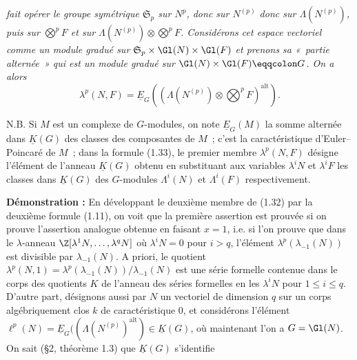 \emph{fait opérer le groupe symétrique $\mathfrak S_p$ sur $N^p$, donc sur $N^{(p)}$ donc sur $\Lambda(N^{(p)})$, puis sur $\bigotimes^p F$ et sur $\Lambda(N^{(p)})\otimes\bigotimes^p F$. Considérons cet espace vectoriel comme un module gradué sur $\mathfrak S_p\times\Gl(N)\times\Gl(F)$ et prenons sa «~partie alternée~» qui est un module gradué sur $\Gl(N)\times\Gl(F)\eqqcolon G$. On a alors}
\begin{equation}\tag{1.33}
\lambda^p(N,F)=\underline{E}_G\left(\left(\Lambda(N^{(p)})\otimes\bigotimes^p F\right)^{\mathrm{alt}}\right).
\end{equation}

N.B. Si $M$ est un complexe de $G$-modules, on note $\underline{E}_G(M)$ la somme alternée dans $\underline{K}(G)$ des classes des composantes de $M$~; c'est la caractéristique d'Euler--Poincaré de $M$~; dans la formule (1.33), le premier membre $\lambda^p(N,F)$ désigne l'élément de l'anneau $\underline{K}(G)$ obtenu en substituant aux variables $\lambda^iN$ et $\lambda^iF$ les classes dans $\underline{K}(G)$ des $G$-modules $\Lambda^i(N)$ et $\Lambda^i(F)$ respectivement.

\textbf{Démonstration :} En développant le deuxième membre de (1.32) par la deuxième formule (1.11), on voit que la première assertion est prouvée si on prouve l'assertion analogue obtenue en faisant $x=1$, i.e. si l'on prouve que dans le $\lambda$-anneau $\Z[\lambda^1N,\ldots,\lambda^qN]$ où $\lambda^iN=0$ pour $i>q$, l'élément $\lambda^p(\lambda_{-1}(N))$ est divisible par $\lambda_{-1}(N)$. A priori, le quotient $\lambda^p(N,1)=\lambda^p(\lambda_{-1}(N))/\lambda_{-1}(N)$ est une série formelle contenue dans le corps des quotients $K$ de l'anneau des séries formelles en les $\lambda^iN$ pour $1\leq i\leq q$. D'autre part, désignons aussi par $N$ un vectoriel de dimension $q$ sur un corps algébriquement clos $k$ de caractéristique $0$, et considérons l'élément $\ell^p(N)=\underline{E}_G((\Lambda(N^{(p)})^{\mathrm{alt}})\in \underline{K}(G)$, où maintenant l'on a $G=\Gl(N)$. On sait (\S 2, théorème 1.3) que $\underline{K}(G)$ s'identifie 

